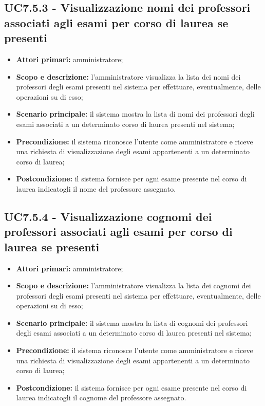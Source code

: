 \documentclass[AnalisiDeiRequisiti.tex]{subfiles}
\begin{document}
\subsection{UC7.5.3 - Visualizzazione nomi dei professori associati agli esami per corso di laurea se presenti}
\begin{itemize}
	\item \textbf{Attori primari:} amministratore;
	\item \textbf{Scopo e descrizione:} l'amministratore visualizza la lista dei nomi dei professori degli esami presenti nel sistema per effettuare, eventualmente, delle operazioni su di esso;
	\item \textbf{Scenario principale:} il sistema mostra la lista di nomi dei professori degli esami associati a un determinato corso di laurea presenti nel sistema;
	\item \textbf{Precondizione:} il sistema riconosce l'utente come amministratore e riceve una richiesta di visualizzazione degli esami appartenenti a un determinato corso di laurea; 
	\item \textbf{Postcondizione:} il sistema fornisce per ogni esame presente nel corso di laurea indicatogli il nome del professore assegnato.
\end{itemize}
\subsection{UC7.5.4 - Visualizzazione cognomi dei professori associati agli esami per corso di laurea se presenti}
\begin{itemize}
	\item \textbf{Attori primari:} amministratore;
	\item \textbf{Scopo e descrizione:} l'amministratore visualizza la lista dei cognomi dei professori degli esami presenti nel sistema per effettuare, eventualmente, delle operazioni su di esso;
	\item \textbf{Scenario principale:} il sistema mostra la lista di cognomi dei professori degli esami associati a un determinato corso di laurea presenti nel sistema;
	\item \textbf{Precondizione:} il sistema riconosce l'utente come amministratore e riceve una richiesta di visualizzazione degli esami appartenenti a un determinato corso di laurea; 
	\item \textbf{Postcondizione:} il sistema fornisce per ogni esame presente nel corso di laurea indicatogli il cognome del professore assegnato.
\end{itemize}
\end{document}
